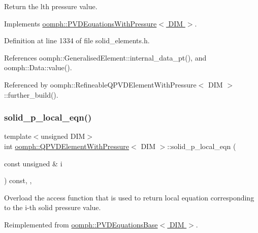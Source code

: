 Return the lth pressure value. 



Implements \hyperlink{classoomph_1_1PVDEquationsWithPressure_a2f447e84104fbdd8afe9efe52c62f2b3}{oomph\+::\+P\+V\+D\+Equations\+With\+Pressure$<$ D\+I\+M $>$}.



Definition at line 1334 of file solid\+\_\+elements.\+h.



References oomph\+::\+Generalised\+Element\+::internal\+\_\+data\+\_\+pt(), and oomph\+::\+Data\+::value().



Referenced by oomph\+::\+Refineable\+Q\+P\+V\+D\+Element\+With\+Pressure$<$ D\+I\+M $>$\+::further\+\_\+build().

\mbox{\label{classoomph_1_1QPVDElementWithPressure_ad155fc71ac4ba895ffba0924f5a1b687}} 
\subsubsection{\texorpdfstring{solid\+\_\+p\+\_\+local\+\_\+eqn()}{solid\_p\_local\_eqn()}}
{\footnotesize\ttfamily template$<$unsigned D\+IM$>$ \\
int \hyperlink{classoomph_1_1QPVDElementWithPressure}{oomph\+::\+Q\+P\+V\+D\+Element\+With\+Pressure}$<$ D\+IM $>$\+::solid\+\_\+p\+\_\+local\+\_\+eqn (\begin{DoxyParamCaption}\item[{const unsigned \&}]{i }\end{DoxyParamCaption}) const\hspace{0.3cm}{\ttfamily [inline]}, {\ttfamily [protected]}, {\ttfamily [virtual]}}



Overload the access function that is used to return local equation corresponding to the i-\/th solid pressure value. 



Reimplemented from \hyperlink{classoomph_1_1PVDEquationsBase_a30d30a7dd711c84a175bf820ea56e3ef}{oomph\+::\+P\+V\+D\+Equations\+Base$<$ D\+I\+M $>$}.



